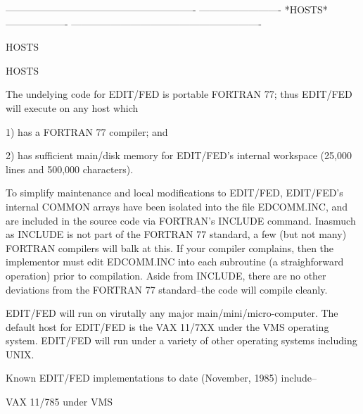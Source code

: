  
 
 
 
 
 
 
 
 
 
 
 
 
 
 
 
 
 
 
 
 
 
 
 
 
 
 
 
 
 
 
 
 
 
----------------------------------------------------------
-------------------------  *HOSTS*  -------------------
----------------------------------------------------------
 
HOSTS
 
HOSTS
 
   The undelying code for EDIT/FED is portable
   FORTRAN 77; thus EDIT/FED will execute
   on any host which
 
      1) has a FORTRAN 77 compiler; and
 
      2) has sufficient main/disk
         memory for EDIT/FED's internal
         workspace (25,000 lines and
         500,000 characters).
 
   To simplify maintenance and local
   modifications to EDIT/FED, EDIT/FED's internal
   COMMON arrays have been isolated into
   the file EDCOMM.INC, and are included
   in the source code via FORTRAN's
   INCLUDE command.  Inasmuch as INCLUDE
   is not part of the FORTRAN 77 standard,
   a few (but not many) FORTRAN compilers will
   balk at this.  If your compiler complains,
   then the implementor must edit EDCOMM.INC
   into each subroutine (a straighforward
   operation) prior to compilation.  Aside from
   INCLUDE, there are no other deviations from
   the FORTRAN 77 standard--the code will
   compile cleanly.
 
   EDIT/FED will run on virutally any major
   main/mini/micro-computer.  The default
   host for EDIT/FED is the VAX 11/7XX under
   the VMS operating system.  EDIT/FED will
   run under a variety of other operating
   systems including UNIX.
 
   Known EDIT/FED implementations to date
   (November, 1985) include--
 
      VAX 11/785 under VMS
 
